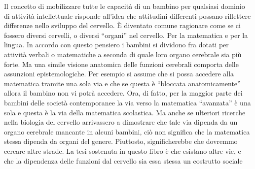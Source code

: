 Il concetto di mobilizzare tutte le capacità di un bambino per qualsiasi dominio di attività intellettuale risponde all'idea che attitudini differenti possano riflettere differenze nello sviluppo del cervello. È diventato comune ragionare come se ci fossero diversi cervelli, o diversi “organi” nel cervello. Per la matematica e per la lingua. In accordo con questo pensiero i bambini si dividono fra dotati per attività verbali o matematiche a seconda di quale loro organo cerebrale sia più forte. Ma una simile visione anatomica delle funzioni cerebrali comporta delle assunzioni epistemologiche. Per esempio si assume che si possa accedere alla matematica tramite una sola via e che se questa è “bloccata anatomicamente” allora il bambino non vi potrà accedere. Ora, di fatto, per la maggior parte dei bambini delle società contemporanee la via verso la matematica “avanzata” è una sola e questa è la via della matematica scolastica. Ma anche se ulteriori ricerche nella biologia del cervello arrivassero a dimostrare che tale via dipenda da un organo cerebrale  mancante in alcuni bambini, ciò non significa che la matematica stessa dipenda da organi del genere. Piuttosto, significherebbe che dovremmo cercare altre strade. La tesi sostenuta in questo libro è che esistano altre vie, e che la dipendenza delle funzioni dal cervello sia essa stessa un costrutto sociale

